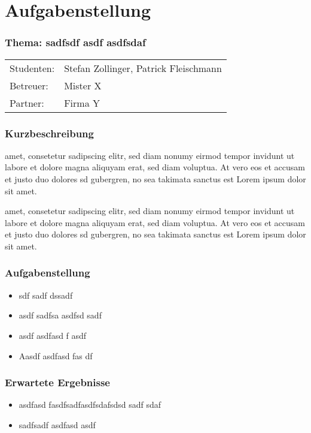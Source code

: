 \chapter{Aufgabenstellung}
\label{chp:aufgabenstellung}

\subsection*{Thema:	sadfsdf asdf  asdfsdaf}
\begin{tabular}{ll}
Studenten: & 	Stefan Zollinger, Patrick Fleischmann \\ 
Betreuer: & 	Mister X \\ 
Partner: & 		Firma Y\\ 
\end{tabular}

\subsection*{Kurzbeschreibung}
amet, consetetur sadipscing elitr, sed diam nonumy eirmod tempor invidunt ut labore et dolore magna aliquyam erat, sed diam voluptua. At vero eos et accusam et justo duo dolores sd gubergren, no sea takimata sanctus est Lorem ipsum dolor sit amet.

amet, consetetur sadipscing elitr, sed diam nonumy eirmod tempor invidunt ut labore et dolore magna aliquyam erat, sed diam voluptua. At vero eos et accusam et justo duo dolores sd gubergren, no sea takimata sanctus est Lorem ipsum dolor sit amet.

\subsection*{Aufgabenstellung}
\begin{itemize}
	\item sdf sadf dssadf 
	\item asdf sadfsa asdfsd sadf 
	\item asdf asdfasd f asdf
	\item Aasdf asdfasd fas df
\end{itemize}

\subsection*{Erwartete Ergebnisse}
\begin{itemize}
	\item asdfasd fasdfsadfasdfsdafsdsd sadf sdaf
	\item sadfsadf asdfasd asdf 
\end{itemize}


